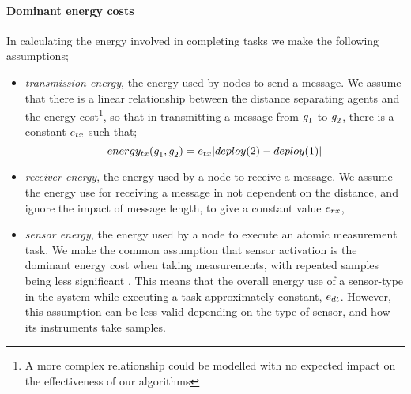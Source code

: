 \paragraph{Dominant energy costs}
\label{section:problem:dominant_energy_costs}
\newcommand{\formalTransmissionEnergy}[2]{
	\functionFormal{energy_{\symbolTransmission{}{}}}
	{\setAgent{}{} \times \setAgent{}{}}
	{\setRealNumbersPositive{}{}}
}
\newcommand{\functionTransmissionEnergy}[2]{
	\functionSignature{energy_{\symbolTransmission{}{}}}
	{\varAgent{#1}{},\varAgent{#2}{}}
}
\newcommand{\functionTransmissionEnergyIndexed}[2]{
	\functionTransmissionEnergy{\varAgent{i}{}}{\varAgent{i+1}{}}
}
\newcommand{\functionTransmissionEnergySink}[2]{
	\functionSignature{energy_{\symbolTransmission{}{}}}
	{\functionSinkRoleAtomic{}{},\varAgent{2}{}}
}
\newcommand{\functionTransmissionEnergyRelay}[2]{
	\functionSignature{energy_{\symbolTransmission{}{}}}
	{\varAgent{#1}{},\varAgent{#2}{}}
}
\newcommand{\functionTransmissionEnergyDetector}[2]{
	\functionSignature{energy_{\symbolTransmission{}{}}}
	{\varAgent{#1}{},\varAgent{#2}{}}
}
In calculating the energy involved in completing tasks we make the following assumptions;
\begin{itemize}
	\item \textit{transmission energy}, the energy used by nodes to send a message. We assume that there is a linear relationship between the distance separating agents and the energy cost\footnote{A more complex relationship could be modelled with no expected impact on the effectiveness of our algorithms}, so that in transmitting a message from $g_{1}^{}$ to $g_{2}^{}$, there is a constant $\varTransmissionEnergy{}{}$ such that;
	\begin{equation}
		\functionTransmissionEnergy{1}{2}
		=  \varTransmissionEnergy{}{}\funcSize{\functionDeployment{2}{} - \functionDeployment{1}{}}
	\end{equation}
	\item \textit{receiver energy}, the energy used by a node to receive a message. We assume the energy use for receiving a message in not dependent on the distance, and ignore the impact of message length, to give a constant value $\varReceiverEnergy{}{}$, 
	\item \textit{sensor energy}, the energy used by a node to execute an atomic measurement task. We make the common assumption that sensor activation is the dominant energy cost when taking measurements, with repeated samples being less significant \citep{Razzaque2014}. This means that the overall energy use of a sensor-type in the system while executing a task approximately constant, $\varSensorEnergy{}{}$. However, this assumption can be less valid depending on the type of sensor, and how its instruments take samples.
\end{itemize}
